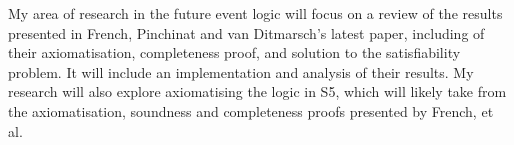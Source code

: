 My area of research in the future event logic will focus on a review of the
results presented in French, Pinchinat and van Ditmarsch's latest
paper\cite{french2010future}, including of their axiomatisation, completeness
proof, and solution to the satisfiability problem. It will include an
implementation and analysis of their results. My research will also explore
axiomatising the logic in S5, which will likely take from the axiomatisation,
soundness and completeness proofs presented by French, et al. 

